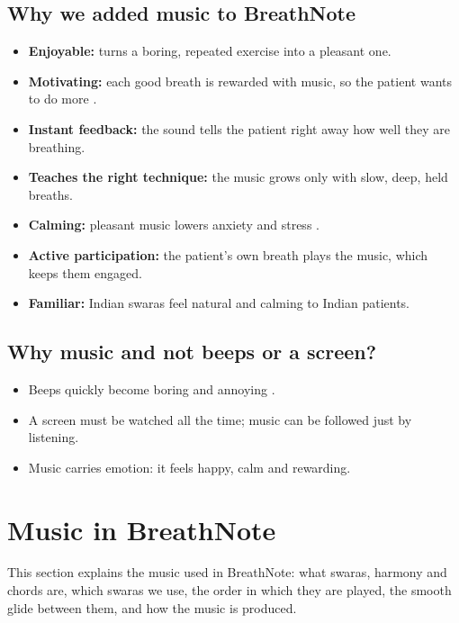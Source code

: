 \documentclass[12pt,a4paper]{article}
\begin{document}
\subsection{Why we added music to BreathNote}
\begin{itemize}
  \item \textbf{Enjoyable:} turns a boring, repeated exercise into a pleasant one.
  \item \textbf{Motivating:} each good breath is rewarded with music, so the patient wants to do more \cite{salimpoor}.
  \item \textbf{Instant feedback:} the sound tells the patient right away how well they are breathing.
  \item \textbf{Teaches the right technique:} the music grows only with slow, deep, held breaths.
  \item \textbf{Calming:} pleasant music lowers anxiety and stress \cite{dewitte}.
  \item \textbf{Active participation:} the patient's own breath plays the music, which keeps them engaged.
  \item \textbf{Familiar:} Indian swaras feel natural and calming to Indian patients.
\end{itemize}

\subsection{Why music and not beeps or a screen?}
\begin{itemize}
  \item Beeps quickly become boring and annoying \cite{bhandari}.
  \item A screen must be watched all the time; music can be followed just by listening.
  \item Music carries emotion: it feels happy, calm and rewarding.
\end{itemize}

\section{Music in BreathNote}
\label{sec:music}

This section explains the music used in BreathNote: what swaras, harmony and chords are, which swaras we use, the order in which they are played, the smooth glide between them, and how the music is produced.
\end{document}
